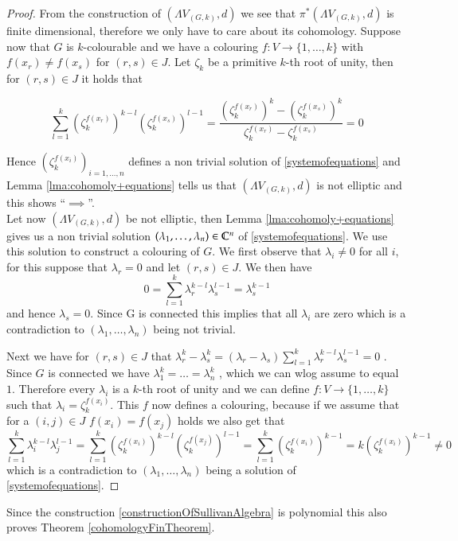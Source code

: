  \begin{proof}
  From the construction of $(\Lambda V_{(G,k)},d)$ we see that  $\pi^*(\Lambda V_{(G,k)},d)$ is finite dimensional, therefore
  we only have to care about its cohomology. Suppose now that $G$ is $k$-colourable and we have a colouring
  $f \colon V \to { \lbrace 1, \dotsc , k \rbrace }$ with $f(x_r) \neq f(x_s)$ for $(r,s) \in J$. Let $\zeta_k$ be a primitive 
  $k$-th root of unity, then for $(r,s) \in J$ it holds that
  
  $$ \sum_{l = 1}^k (\zeta_k^{f(x_r)})^{k-l} (\zeta_k^{f(x_s)})^{l-1}
  = \frac{(\zeta_k^{f(x_r)})^{k} - (\zeta_k^{f(x_s)})^{k}}{ \zeta_k^{f(x_r)} - \zeta_k^{f(x_s)}} = 0
  $$
  
  Hence $(\zeta_k^{f(x_i)})_{i = 1, \dotsc, n}$ defines a non trivial solution of \ref{systemofequations}
  and Lemma \ref{lma:cohomoly+equations} tells us that $(\Lambda V_{(G,k)},d)$ is not elliptic and this shows
  ``$\implies$''. \\
  Let now $(\Lambda V_{(G,k)},d)$ be not elliptic, then Lemma \ref{lma:cohomoly+equations} gives us a non trivial
  solution $(\lambda_1 , \dotsc, \lambda_n) \in \mathbb{C}^n$ of \ref{systemofequations}. We use this solution to construct
  a colouring of $G$. 
  We first observe that $\lambda_i \neq 0$ for all $i$, for this suppose that $\lambda_r = 0$ and let $(r,s) \in J$.
  We then have 
  $$0 =\sum_{l = 1}^k \lambda_r^{k -l} \lambda_s^{l - 1} = \lambda_s^{k-1}$$
  and hence $\lambda_s = 0$. Since G is connected this implies that all $\lambda_i$ are zero which is a
  contradiction to $(\lambda_1, \ldots, \lambda_n)$ being not trivial.
  
  Next we have
  for $(r,s) \in J$ that $ \lambda_r^k - \lambda_s^k = ( \lambda_r - \lambda_s) 
  \sum_{l = 1}^k \lambda_r^{k - l} \lambda_s^{l - 1} = 0$ . Since $G$ is connected we have 
  $\lambda_1^k = \dotsc = \lambda_n^k$ , which we can wlog assume to equal $1$. Therefore every $\lambda_i$ is a 
  $k$-th root of unity and we can define $f \colon V \to { \lbrace 1, \dotsc , k \rbrace }$ such that 
  $\lambda_i = \zeta_k^{f(x_i)}$. This $f$ now defines a colouring, because if we assume that for a $(i,j) \in J$
  $f(x_i) = f(x_j)$ holds we also get that 
  $$\sum_{l = 1}^k \lambda_i^{k - l} \lambda_j^{l - 1} = \sum_{l = 1}^k (\zeta_k^{f(x_i)})^{k-l} (\zeta_k^{f(x_j)})^{l-1}
  = \sum_{l = 1}^k (\zeta_k^{f(x_i)})^{k-1} = k (\zeta_k^{f(x_i)})^{k-1} \neq 0$$ 
  which is a contradiction to $(\lambda_1 , \dotsc, \lambda_n)$ being a solution of \ref{systemofequations}.
  
 \end{proof}

 Since the construction \ref{constructionOfSullivanAlgebra} is polynomial this also proves Theorem \ref{cohomologyFinTheorem}.
